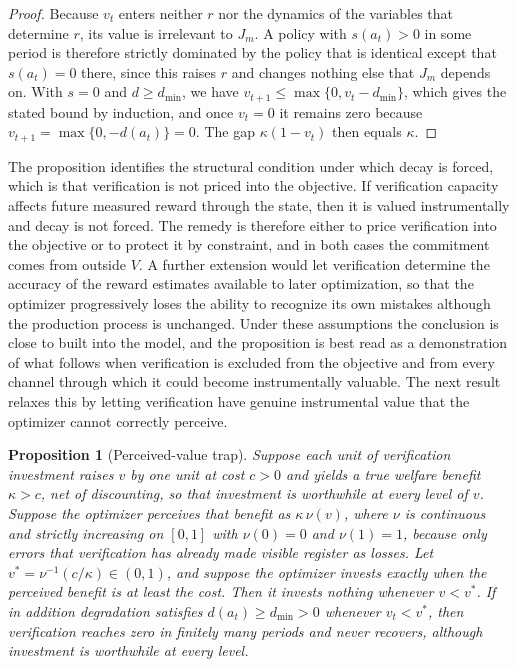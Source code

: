 \documentclass[11pt]{article}
\newtheorem{proposition}{Proposition}
\theoremstyle{definition}
\theoremstyle{remark}
\begin{document}
\begin{proof}
Because $v_t$ enters neither $r$ nor the dynamics of the variables that determine $r$, its value is irrelevant to $J_m$. A policy with $s(a_t)>0$ in some period is therefore strictly dominated by the policy that is identical except that $s(a_t)=0$ there, since this raises $r$ and changes nothing else that $J_m$ depends on. With $s=0$ and $d\ge d_{\min}$, we have $v_{t+1}\le\max\{0,v_t-d_{\min}\}$, which gives the stated bound by induction, and once $v_t=0$ it remains zero because $v_{t+1}=\max\{0,-d(a_t)\}=0$. The gap $\kappa(1-v_t)$ then equals $\kappa$.
\end{proof}

The proposition identifies the structural condition under which decay is forced, which is that verification is not priced into the objective. If verification capacity affects future measured reward through the state, then it is valued instrumentally and decay is not forced. The remedy is therefore either to price verification into the objective or to protect it by constraint, and in both cases the commitment comes from outside $V$. A further extension would let verification determine the accuracy of the reward estimates available to later optimization, so that the optimizer progressively loses the ability to recognize its own mistakes although the production process is unchanged. Under these assumptions the conclusion is close to built into the model, and the proposition is best read as a demonstration of what follows when verification is excluded from the objective and from every channel through which it could become instrumentally valuable. The next result relaxes this by letting verification have genuine instrumental value that the optimizer cannot correctly perceive.

\begin{proposition}[Perceived-value trap]
\label{prop:trap}
Suppose each unit of verification investment raises $v$ by one unit at cost $c>0$ and yields a true welfare benefit $\kappa>c$, net of discounting, so that investment is worthwhile at every level of $v$. Suppose the optimizer perceives that benefit as $\kappa\,\nu(v)$, where $\nu$ is continuous and strictly increasing on $[0,1]$ with $\nu(0)=0$ and $\nu(1)=1$, because only errors that verification has already made visible register as losses. Let $v^{*}=\nu^{-1}(c/\kappa)\in(0,1)$, and suppose the optimizer invests exactly when the perceived benefit is at least the cost. Then it invests nothing whenever $v<v^{*}$. If in addition degradation satisfies $d(a_t)\ge d_{\min}>0$ whenever $v_t<v^{*}$, then verification reaches zero in finitely many periods and never recovers, although investment is worthwhile at every level.
\end{proposition}
\end{document}
